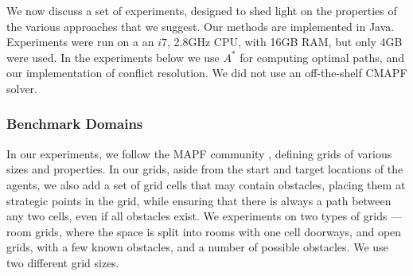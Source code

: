 \documentclass[letterpaper]{article} %
\newcommand{\plan}[1]{{\textcolor{blue}{[Plan: #1]}}}
\newcommand{\commentout}[1]{}
\begin{document}
We now discuss a set of experiments, designed to shed light on the properties of the various approaches that we suggest. Our methods are implemented in Java. Experiments were run on a an $i7$, 2.8GHz CPU, with 16GB RAM, but only 4GB were used.
In the experiments below we use $A^*$ for computing optimal paths, and our implementation of conflict resolution. We did not use an off-the-shelf CMAPF solver.


\subsubsection{Benchmark Domains}

In our experiments, we follow the MAPF community \cite{stern2019multi}, defining grids of various sizes and properties. In our grids, aside from the start and target locations of the agents, we also add a set of grid cells that may contain obstacles, placing them at strategic points in the grid, while ensuring that there is always a path between any two cells, even if all obstacles exist.
We experiments on two types of grids --- room grids, where the space is split into rooms with one cell doorways, and open grids, with a few known obstacles, and a number of possible obstacles.
We use two different grid sizes. 

\commentout{
To create benchmark MAPFOU problems, we use standard problems from the MAPF community \cite{}. All problems are defined on grid settings.

A classical MAPF problem is defined by a graph (grid) and a set of $k$ source and target vertices. Corresponding to that, a benchmark domain for MAPF includes a set of graphs.
\\We evaluated our methods on two general benchmark domains that are commonly used:
\begin{itemize}
  \item \textbf{Open N × N grids with random obstacles}. These are N × N grids, where all grid cells are accessible but a set of grid cells that are randomly selected and are considered to be impassable (static obstacles).
  \plan{TODO insert image}
  \item \textbf{Room Grid-Based MAPF}. These are N x N Grids, that are divided for same sized rooms. Each rooms has at least one "door" - accessible empty cell on the border of the room that lead to another room. Two or more doors from a given room can lead to the same room or to different rooms.  
\plan{TODO insert image}
\end{itemize}


\plan{new experiments with A* - MA}
\\Another set of experiments that we executed is comparison between our method to classic A* for multi-agent settings. In multi-agent A* a node is represented a state of all agents' locations, and an edge is existing iff it doesn't cause for conflicts and iff the transition for each agent between the two vertices location is legal. We would like to examine the improvement of our method against the classical state-of-the-art solution 
}
\end{document}

